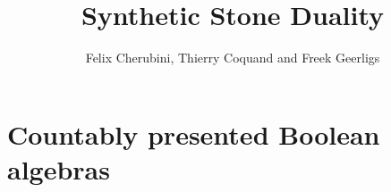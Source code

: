 \documentclass{../util/zariski-small}
\title{Synthetic Stone Duality}
\begin{document}
\author{Felix Cherubini, Thierry Coquand and Freek Geerligs}

\maketitle

%
\section{Countably presented Boolean algebras}
\end{document}
